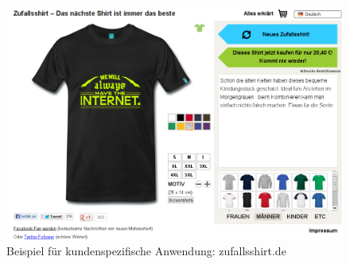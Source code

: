 \begin{frame}
    \begin{figure}
        \includegraphics[height=0.8\textheight]{resources/zufallsshirt}
        \caption{Beispiel für kundenspezifische Anwendung: zufallsshirt.de}
    \end{figure}
\end{frame}
